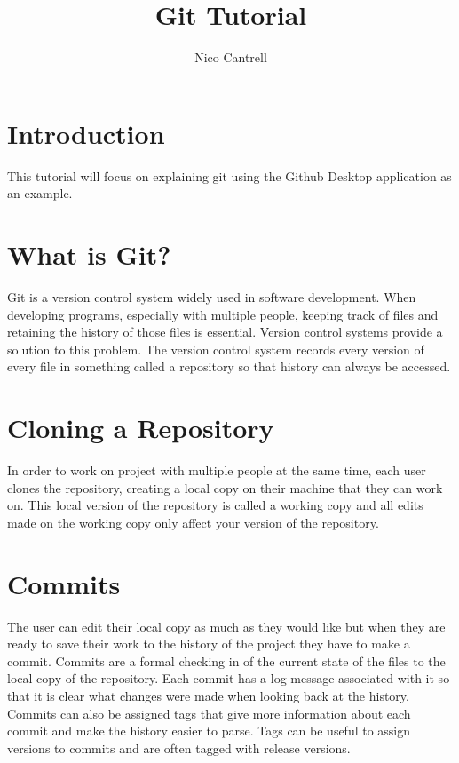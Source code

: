 \documentclass[10pt,twocolumn]{article}
\title{Git Tutorial}
\author{Nico Cantrell}
\affiliation{Occidental College}
\begin{document}
\maketitle

\section{Introduction}

This tutorial will focus on explaining git using the Github Desktop application as an example.

\section{What is Git?}

    Git is a version control system widely used in software development. When developing programs, especially with multiple people, keeping track of files and retaining the history of those files is essential. Version control systems provide a solution to this problem. The version control system records every version of every file in something called a repository so that history can always be accessed.

\section{Cloning a Repository}

    In order to work on project with multiple people at the same time, each user clones the repository, creating a local copy on their machine that they can work on. This local version of the repository is called a working copy and all edits made on the working copy only affect your version of the repository.    

\section{Commits}

    The user can edit their local copy as much as they would like but when they are ready to save their work to the history of the project they have to make a commit. Commits are a formal checking in of the current state of the files to the local copy of the repository. Each commit has a log message associated with it so that it is clear what changes were made when looking back at the history. Commits can also be assigned tags that give more information about each commit and make the history easier to parse. Tags can be useful to assign versions to commits and are often tagged with release versions.
\end{document}
